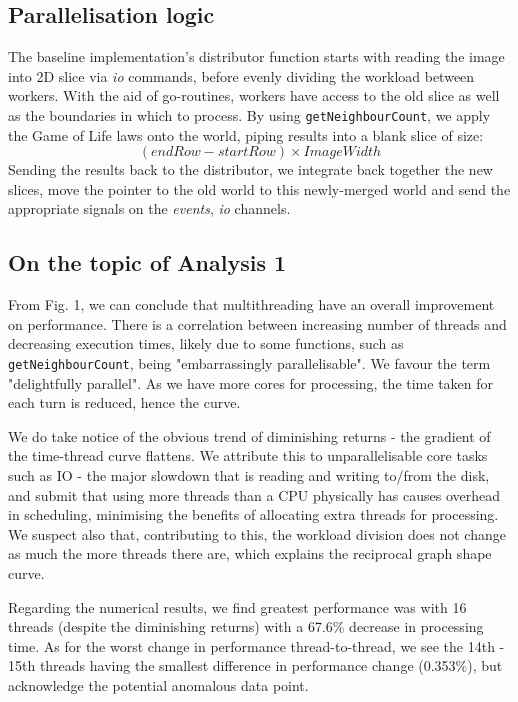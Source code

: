 \documentclass[twoside,twocolumn]{article}
\begin{document}
\subsection{Parallelisation logic}
The baseline implementation's distributor function starts with
reading the image into 2D slice via \textit{io} commands, before evenly dividing 
the workload between workers. With the aid of go-routines, workers have access to the old slice
as well as the boundaries in which to process. By using \texttt{getNeighbourCount}, we apply the Game of Life
laws onto the world, piping results into a blank slice of size: \[( endRow - startRow ) \times ImageWidth\]
Sending the results back to the distributor, we integrate back together the new slices, move the pointer to the old world
to this newly-merged world and send the appropriate signals on the \textit{events}, \textit{io} channels.


\subsection{On the topic of Analysis 1}

From Fig. 1, we can conclude that multithreading have an overall improvement on performance. 
There is a correlation between increasing number of threads and decreasing execution times, likely due 
to some functions, such as \texttt{getNeighbourCount}, being "embarrassingly parallelisable". We 
favour the term "delightfully parallel". As we have more cores for processing, the time taken for each turn is 
reduced, hence the curve. 

We do take notice of the obvious trend of diminishing returns - 
the gradient of the time-thread curve flattens. We attribute this to unparallelisable core tasks such as IO 
- the major slowdown that is reading and writing to/from the disk, and submit that using more threads than 
a CPU physically has causes overhead in scheduling, minimising the benefits of allocating extra threads for processing.
We suspect also that, contributing to this, the workload division does not change as much the more threads there are,
which explains the reciprocal graph shape curve.

Regarding the numerical results, we find greatest performance was with 16 threads (despite the diminishing returns)
with a 67.6\% decrease in processing time. As for the worst change in performance thread-to-thread, 
we see the 14th - 15th threads having the smallest difference in performance change (0.353\%), but acknowledge the
potential anomalous data point.
\end{document}
